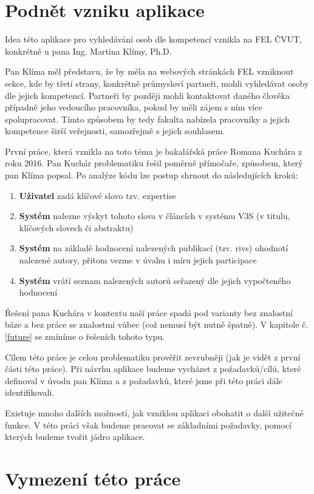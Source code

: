 \section{Podnět vzniku aplikace} %
Idea této aplikace pro vyhledávání osob dle kompetencí vznikla na FEL ČVUT, konkrétně u pana Ing. Martina Klímy, Ph.D.\par
Pan Klíma měl představu, že by měla na webových stránkách FEL vzniknout sekce, kde by třetí strany, konkrétně průmysloví partneři, mohli vyhledávat osoby dle jejich kompetencí. Partneři by později mohli kontaktovat daného člověka případně jeho vedoucího pracovníka, pokud by měli zájem s ním více spolupracovat. Tímto způsobem by tedy fakulta nabízela pracovníky a jejich kompetence širší veřejnosti, samozřejmě s jejich souhlasem.\par
První práce, která vznikla na toto téma je bakalářská práce Romana Kuchára z roku 2016. Pan Kuchár problematiku řešil poměrně přímočaře, způsobem, který pan Klíma popsal. \cite{kuchar} Po analýze kódu lze postup shrnout do následujících kroků:
\begin{enumerate}
    \item \textbf{Uživatel} zadá klíčové slovo tzv. expertise
    \item \textbf{Systém} nalezne výskyt tohoto slova v článcích v systému V3S (v titulu, klíčových slovech či abstraktu)
    \item \textbf{Systém} na základě hodnocení nalezených publikací (tzv. rivs) ohodnotí nalezené autory, přitom vezme v úvahu i míru jejich participace
    \item \textbf{Systém} vrátí seznam nalezených autorů seřazený dle jejich vypočteného hodnocení
\end{enumerate}
Řešení pana Kuchára v kontextu naší práce spadá pod varianty bez znalostní báze a bez práce se znalostmi vůbec (což nemusí být nutně špatně). V kapitole č. \ref{future} se zmíníme o řešeních tohoto typu.\par
Cílem této práce je celou problematiku prověřit zevrubněji (jak je vidět z první části této práce). Při návrhu aplikace budeme vycházet z požadavků/cílů, které definoval v úvodu pan Klíma a z požadavků, které jsme při této práci dále identifikovali.\par
Existuje mnoho dalších možností, jak vzniklou aplikaci obohatit o další užitečné funkce. V této práci však budeme pracovat se základními požadavky, pomocí kterých budeme tvořit jádro aplikace.
\section{Vymezení této práce}
